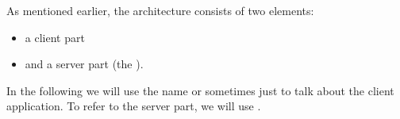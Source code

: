As mentioned earlier, the \GD architecture consists of two elements: 
\begin{itemize}
\item a client part
\item and a server part (the \gdserver).
\end{itemize}
In the following we will use the name \GD or sometimes just
 to talk about the client application. 
To refer to the server part, we will 
use \gdserver{}.

